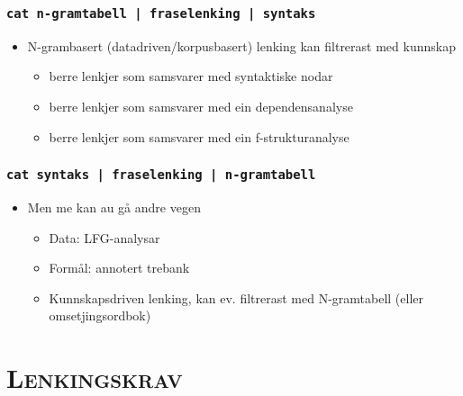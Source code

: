 \documentclass[xcolor=x11names,compress,bigger]{beamer}
\renewcommand{\(}{\begin{columns}}
\renewcommand{\)}{\end{columns}}
\newcommand{\<}[1]{\begin{column}{#1}}
\renewcommand{\>}{\end{column}}
\begin{document}
\begin{frame}\frametitle{\texttt{\normalsize cat n-gramtabell | fraselenking | syntaks}}
    \begin{itemize}
    \item N-grambasert (datadriven/korpusbasert) lenking kan filtrerast med kunnskap
      \begin{itemize}
       \item berre lenkjer som samsvarer med syntaktiske nodar \citep{samuelsson2007apa}
       \item berre lenkjer som samsvarer med ein dependensanalyse \citep{hearne2008ccd}
       \item berre lenkjer som samsvarer med ein f-strukturanalyse \citep{graham2009osr}
      \end{itemize}
    \end{itemize}
  \end{frame}

\begin{frame}\frametitle{\texttt{\normalsize cat syntaks | fraselenking | n-gramtabell}}
  \begin{itemize}
  \item Men me kan au gå andre vegen
    \begin{itemize}
    \item Data: LFG-analysar
    \item Formål: annotert trebank
    \item Kunnskapsdriven lenking, kan ev. filtrerast med N-gramtabell
      (eller omsetjingsordbok)
    \end{itemize}
  \end{itemize}
\end{frame}

\section{\scshape Lenkingskrav}
\end{document}
